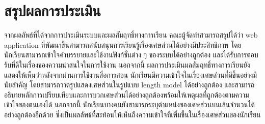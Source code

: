 \section{สรุปผลการประเมิน}
จากผลลัพธ์ที่ได้จากการประเมินระบบและผลสัมฤทธิ์ทางการเรียน คณะผู้จัดทำสามารถสรุปได้ว่า web application ที่พัฒนาขึ้นสามารถสนับสนุนการเรียนรู้เรื่องเศษส่วนได้อย่างมีประสิทธิภาพ โดยนักเรียนสามารถเข้าใจคำบรรยายและใช้งานฟังก์ชั่นต่าง ๆ ของระบบได้อย่างถูกต้อง
และได้รับการตอบรับที่ดีในเรื่องของความน่าสนใจในการใช้งาน นอกจากนี้ ผลการประเมินผลสัมฤทธิ์ทางการเรียนยังแสดงให้เห็นว่าหลังจากผ่านการใช้งานสื่อการสอน นักเรียนมีความเข้าใจในเรื่องเศษส่วนที่ดีขึ้นอย่างมีนัยสำคัญ โดยสามารถวาดรูปแสดงเศษส่วนในรูปแบบ length model ได้อย่างถูกต้อง
และสามารถอธิบายหลักการเปรียบเทียบและการบวกเศษส่วนได้อย่างถูกต้องพร้อมให้เหตุผลที่ถูกต้องตามความเข้าใจของตนเองได้ นอกจากนี้ นักเรียนบางคนยังสามารถระบุตำแหน่งของเศษส่วนบนเส้นจำนวนได้อย่างถูกต้องอีกด้วย ซึ่งเป็นผลลัพธ์ที่สะท้อนให้เห็นถึงความเข้าใจที่เพิ่มขึ้นในเรื่องเศษส่วนของนักเรียน